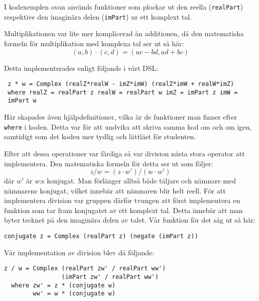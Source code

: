 \documentclass[]{article}
\begin{document}
I kodexemplen ovan används funktioner som plockar ut den reella
(\texttt{realPart}) respektive den imaginära delen
(\texttt{imPart}) ur ett komplext tal.

Multiplikationen var lite mer komplicerad än additionen, då den
matematiska formeln för multiplikation med komplexa tal ser ut så här:
 \[(a, b) \cdot (c, d) = (ac - bd, ad + bc) \] \cite{conway1978functions}

Detta implementerades enligt följande i vårt DSL:
\begin{verbatim}
 z * w = Complex (realZ*realW - imZ*imW) (realZ*imW + realW*imZ)
 where realZ = realPart z realW = realPart w imZ = imPart z imW =
 imPart w
\end{verbatim}

Här skapades även hjälpdefinitioner, vilka är de funktioner man finner
efter \texttt{where} i koden. Detta var för att undvika
att skriva samma kod om och om igen, samtidigt som det koden mer
tydlig och lättläst för studenten.

Efter att dessa operationer var färdiga så var division nästa stora
operator att implementera. Den matematiska formeln för detta ser ut
som följer:
\[ z / w = (z \cdot w') / (w \cdot w') \]
där $w'$ är $w$:s konjugat.
Man förlänger alltså både täljare och nämnare med nämnarens konjugat,
vilket innebär att nämnaren blir helt reell. För att implementera
division var gruppen därför tvungen att först implementera en funktion
som tar fram konjugatet av ett komplext tal. Detta innebär att man
byter tecknet på den imaginära delen av talet. Vår funktion för det
såg ut så här:

\begin{verbatim}
conjugate z = Complex (realPart z) (negate (imPart z))
\end{verbatim}
Vår implementation av division blev då följande:
\begin{verbatim}
z / w = Complex (realPart zw' / realPart ww')
                (imPart zw' / realPart ww')
  where zw' = z * (conjugate w)
        ww' = w * (conjugate w)
\end{verbatim}
\end{document}
